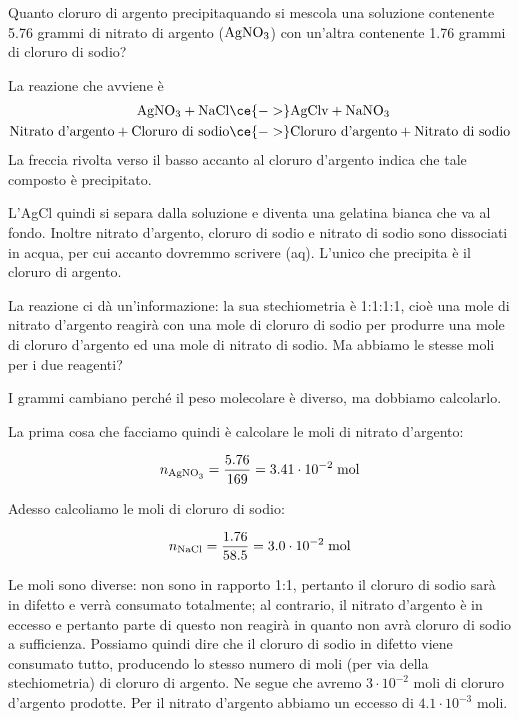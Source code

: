 \newpage

\begin{esercizio}[$\bigstar$]
    Quanto cloruro di argento precipita\footnotemark\;quando si mescola una soluzione contenente 5.76 grammi di nitrato di argento ($\rm AgNO_3$) con un'altra contenente 1.76 grammi di cloruro di sodio?
\end{esercizio}
\begin{soluzione}
    La reazione che avviene è
    \begin{equation*}
        \begin{split}
            \rm AgNO_3 + NaCl & \ce{->} \rm AgCl v + NaNO_3
            \\
            \text{Nitrato d'argento} + \text{Cloruro di sodio} & \ce{->} \text{Cloruro d'argento} + \text{Nitrato di sodio}
        \end{split}
    \end{equation*}
    La freccia rivolta verso il basso accanto al cloruro d'argento indica che tale composto è precipitato.

L'AgCl quindi si separa dalla soluzione e diventa una gelatina bianca che va al fondo. Inoltre nitrato d'argento, cloruro di sodio e nitrato di sodio sono dissociati in acqua, per cui accanto dovremmo scrivere (aq). L'unico che precipita è il cloruro di argento.

La reazione ci dà un'informazione: la sua stechiometria è 1:1:1:1, cioè una mole di nitrato d'argento reagirà con una mole di cloruro di sodio per produrre una mole di cloruro d'argento ed una mole di nitrato di sodio. Ma abbiamo le stesse moli per i due reagenti?

I grammi cambiano perché il peso molecolare è diverso, ma dobbiamo calcolarlo.

La prima cosa che facciamo quindi è calcolare le moli di nitrato d'argento:

$$n_{\text{AgNO}_3}=\frac{5.76}{169}=3.41 \cdot 10^{-2} \; \rm mol $$

Adesso calcoliamo le moli di cloruro di sodio:

$$n_{\text{NaCl}}=\frac{1.76}{58.5}=3.0 \cdot 10^{-2} \; \rm mol$$

Le moli sono diverse: non sono in rapporto 1:1, pertanto il cloruro di sodio sarà in difetto e verrà consumato totalmente; al contrario, il nitrato d'argento è in eccesso e pertanto parte di questo non reagirà in quanto non avrà cloruro di sodio a sufficienza. Possiamo quindi dire che il cloruro di sodio in difetto viene consumato tutto, producendo lo stesso numero di moli (per via della stechiometria) di cloruro di argento. Ne segue che avremo $3 \cdot 10^{-2}$ moli di cloruro d'argento prodotte. Per il nitrato d'argento abbiamo un eccesso di $4.1 \cdot 10^{-3}$ moli.


\end{soluzione}
